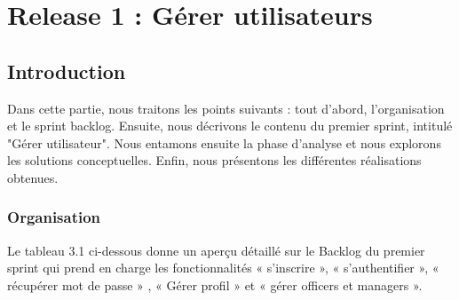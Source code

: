 \chapter{Release 1 : Gérer utilisateurs}
\label{chap_sprint1}
\section*{Introduction}
\label{sec_introduction}
Dans cette partie, nous traitons les points suivants : tout d'abord, l'organisation et le sprint backlog. Ensuite, nous décrivons le contenu du premier sprint, intitulé "Gérer utilisateur". Nous entamons ensuite la phase d'analyse et nous explorons les solutions conceptuelles. Enfin, nous présentons les différentes réalisations obtenues.

\subsection{Organisation}
Le tableau 3.1 ci-dessous donne un aperçu détaillé sur le Backlog du premier sprint qui prend en
charge les fonctionnalités « s'inscrire », « s'authentifier », « récupérer mot de passe » , « Gérer profil » et « gérer officers et managers ».


